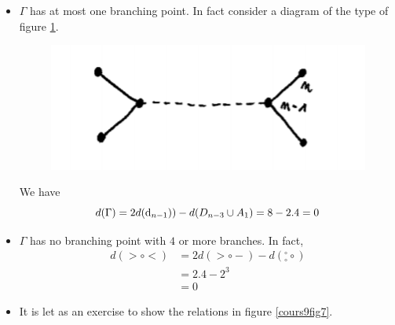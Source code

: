 \begin{itemize}
\item $\Gamma$ has at most one branching point. In fact consider a diagram of the type of figure \ref{cours9fig6}.

\begin{figure}[h!]
\centering
\includegraphics[scale=0.6]{cours9fig6.png}
\caption{}
\label{cours9fig6}
\end{figure}

We have
\begin{equation}
d(\Gamma) = 2 d(\mathrm{d}_{n-1})) - d (D_{n-3} \cup A_1 ) = 8 - 2.4 = 0
\end{equation}

\item $\Gamma$ has no branching point with $4$ or more branches. In fact,
\begin{equation}
\begin{split}
d(>\circ < ) &= 2 d (>\circ - ) - d ({}_\circ^\circ \circ) \\
&= 2 . 4 - 2^3 \\
&=0
\end{split}
\end{equation}

\item It is let as an exercise to show the relations in figure \ref{cours9fig7}.


\end{itemize}
